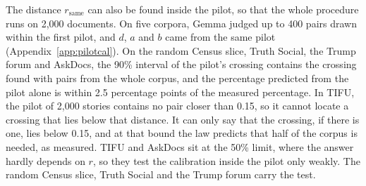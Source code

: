 The distance $r_{\mathrm{same}}$ can also be found inside the pilot, so that the whole procedure runs on 2{,}000 documents. On five corpora, Gemma judged up to 400 pairs drawn within the first pilot, and $d$, $a$ and $b$ came from the same pilot (Appendix~\ref{app:pilotcal}). On the random Census slice, Truth Social, the Trump forum and AskDocs, the 90\% interval of the pilot's crossing contains the crossing found with pairs from the whole corpus, and the percentage predicted from the pilot alone is within 2.5 percentage points of the measured percentage. In TIFU, the pilot of 2{,}000 stories contains no pair closer than 0.15, so it cannot locate a crossing that lies below that distance. It can only say that the crossing, if there is one, lies below 0.15, and at that bound the law predicts that half of the corpus is needed, as measured. TIFU and AskDocs sit at the 50\% limit, where the answer hardly depends on $r$, so they test the calibration inside the pilot only weakly. The random Census slice, Truth Social and the Trump forum carry the test.
